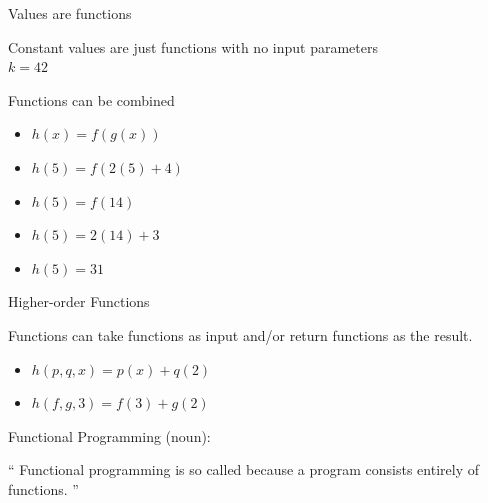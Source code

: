 \documentclass{beamer}
\begin{document}
\begin{frame}{Values are functions}

  {\large Constant values are just functions with no input parameters}
  \\
  {\Huge $k = 42$}

\end{frame}

\begin{frame}{Functions can be combined}

  \begin{itemize}[<+->]
  \item {\Huge $h(x) = f(g(x))$}
  \item {\Huge $h(5) = f(2(5) + 4)$}
  \item {\Huge $h(5) = f(14)$}
  \item {\Huge $h(5) = 2(14) + 3$}
  \item {\Huge $h(5) = 31$}
  \end{itemize}

\end{frame}

\begin{frame}{Higher-order Functions}

  {\Large Functions can take functions as input and/or return
    functions as the result.}

  \begin{itemize}[<+->]
  \item {\Huge $h(p, q, x) = p(x) + q(2)$}
  \item {\Huge $h(f, g, 3) = f(3) + g(2)$}
  \end{itemize}

\end{frame}

\begin{frame}{Functional Programming (noun):}

  \begin{exampleblock}{}
    {\Large ``
      Functional programming is so called because a program consists entirely of functions.
      ''}
    \vskip5mm
    \hspace*{}
  \end{exampleblock}

  
\end{frame}
\end{document}
